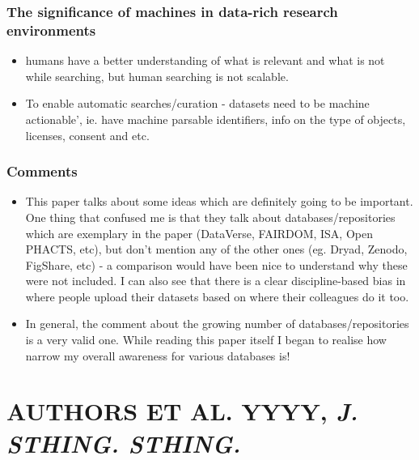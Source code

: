 \documentclass[
]{book}
\providecommand{\tightlist}{%
  \setlength{\itemsep}{0pt}\setlength{\parskip}{0pt}}
\begin{document}
\hypertarget{the-significance-of-machines-in-data-rich-research-environments}{%
\subsection{The significance of machines in data-rich research environments}\label{the-significance-of-machines-in-data-rich-research-environments}}

\begin{itemize}
\tightlist
\item
  humans have a better understanding of what is relevant and what is not while searching, but human searching is not scalable.
\item
  To enable automatic searches/curation - datasets need to be machine actionable', ie. have machine parsable identifiers, info on the type of objects, licenses, consent and etc.
\end{itemize}

\hypertarget{comments}{%
\subsection{Comments}\label{comments}}

\begin{itemize}
\tightlist
\item
  This paper talks about some ideas which are definitely going to be important. One thing that confused me is that they talk about databases/repositories which are exemplary in the paper (DataVerse, FAIRDOM, ISA, Open PHACTS, etc), but don't mention any of the other ones (eg. Dryad, Zenodo, FigShare, etc) - a comparison would have been nice to understand why these were not included. I can also see that there is a clear discipline-based bias in where people upload their datasets based on where their colleagues do it too.
\item
  In general, the comment about the growing number of databases/repositories is a very valid one. While reading this paper itself I began to realise how narrow my overall awareness for various databases is!
\end{itemize}

\hypertarget{authors-et-al.-yyyy-j.-sthing.-sthing.}{%
\chapter{\texorpdfstring{AUTHORS ET AL. YYYY, \emph{J. STHING. STHING.}}{AUTHORS ET AL. YYYY, J. STHING. STHING.}}\label{authors-et-al.-yyyy-j.-sthing.-sthing.}}
\end{document}
